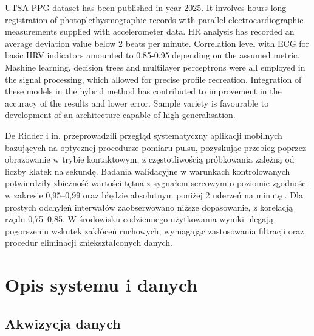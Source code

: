 \documentclass[journal]{IEEEtran}
\begin{document}
{UTSA-PPG dataset \cite{18} has been published in year 2025. It involves hours-long registration of photoplethysmographic records with parallel electrocardiographic measurements supplied with accelerometer data. HR analysis has recorded an average deviation value below 2 beats per minute. Correlation level with ECG for basic HRV indicators amounted to 0.85-0.95 depending on the assumed metric. Mashine learning, decision trees and multilayer perceptrons were all employed in the signal processing, which allowed for precise profile recreation. Integration of these models in the hybrid method has contributed to improvement in the accuracy of the results and lower error. Sample variety is favourable to development of an architecture capable of high generalisation.

\newpage
De Ridder i in. \cite{19} przeprowadzili przegląd systematyczny aplikacji mobilnych bazujących na optycznej procedurze pomiaru pulsu, pozyskując przebieg poprzez obrazowanie w trybie kontaktowym, z częstotliwością próbkowania zależną od liczby klatek na sekundę. Badania walidacyjne w warunkach kontrolowanych potwierdziły zbieżność wartości tętna z sygnałem sercowym o poziomie zgodności w zakresie 0,95–0,99 oraz błędzie absolutnym poniżej 2 uderzeń na minutę \cite{20}. Dla prostych odchyleń interwałów zaobserwowano niższe dopasowanie, z korelacją rzędu 0,75–0,85. W środowisku codziennego użytkowania wyniki ulegają pogorszeniu wskutek zakłóceń ruchowych, wymagając zastosowania filtracji oraz procedur eliminacji zniekształconych danych.


\section{Opis systemu i danych}
\subsection{Akwizycja danych}
}
\end{document}
